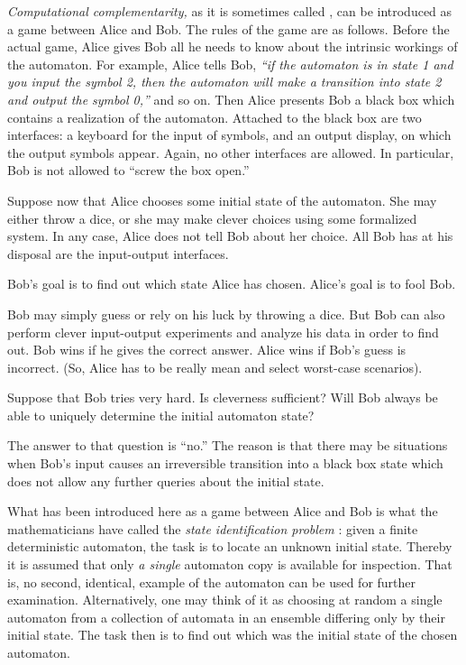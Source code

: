 \documentclass [11pt]{llncs}
\begin{document}
{\em Computational complementarity,}
 as it is sometimes called
\cite{finkelstein-83}, can be introduced as a game between Alice and
Bob. The rules of the game are as follows.
Before the actual game, Alice gives Bob all he needs to know about
the intrinsic workings of the
automaton. For example, Alice tells Bob, {\it ``if the automaton is in
state
1 and
you input the symbol 2, then the automaton will make a transition into
state 2 and output the symbol 0,''} and so on.
Then Alice presents Bob a black box which contains a realization of
the automaton. Attached to the black box are two interfaces:  a
keyboard for the
input of  symbols, and an output display, on which
the output symbols appear. Again, no other interfaces are allowed.
In particular, Bob is not allowed to ``screw the box open.''


Suppose now that Alice chooses some initial state of the
automaton.
She may either throw a dice, or she may make clever choices using some
formalized system.
In any case, Alice does not tell Bob about her choice. All Bob
has at his disposal are the input-output interfaces.

Bob's goal is to
find out which state Alice has chosen.
Alice's goal is to fool Bob.

Bob may
simply guess
or rely on his luck by throwing a dice. But Bob can also perform
clever input-output experiments and analyze
his data in order to find out. Bob wins if he gives the correct answer.
Alice wins if Bob's guess is incorrect. (So, Alice has to be really mean
and select worst-case scenarios).

Suppose that Bob tries very hard. Is cleverness sufficient?
Will Bob always be able to uniquely determine the initial automaton
state?

The answer to that question is ``no.'' The reason
is that there may be situations when Bob's input causes an irreversible
transition into a black box state which does not allow any
further queries about the initial state.

What has been introduced here as a game between Alice and Bob is
what the mathematicians have called the
{\em state identification problem}
\cite{e-f-moore,chaitin-65,conway,brauer-84}:
given a finite deterministic
automaton, the task is  to locate
an unknown initial state.  Thereby it is assumed that
only {\em a single} automaton copy is available for inspection.  That
is, no second, identical, example of the automaton can be used for
further examination.  Alternatively, one may think of it as choosing at
random a single automaton from a collection of automata in an ensemble
differing only by
their initial state.  The task then is to find out which was the initial
state of the chosen automaton.
\end{document}

